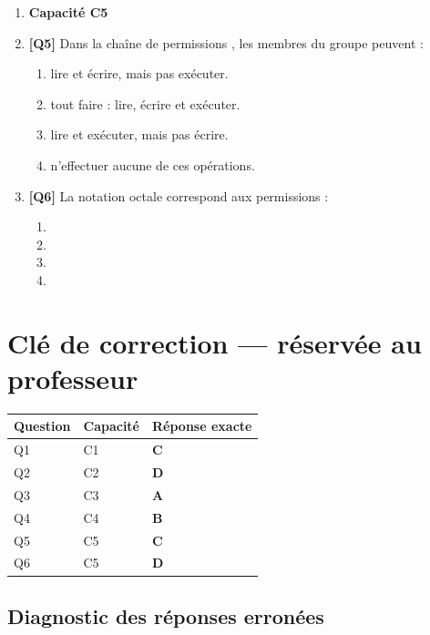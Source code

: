 \begin{enumerate}
\item[] \textbf{Capacité C5}

\item \textbf{[Q5]} Dans la chaîne de permissions , les membres du groupe peuvent :
  \begin{enumerate}[label=\Alph*.]
    \item lire et écrire, mais pas exécuter.
    \item tout faire : lire, écrire et exécuter.
    \item lire et exécuter, mais pas écrire.
    \item n'effectuer aucune de ces opérations.
  \end{enumerate}

\item \textbf{[Q6]} La notation octale  correspond aux permissions :
  \begin{enumerate}[label=\Alph*.]
    \item {}
    \item {}
    \item {}
    \item {}
  \end{enumerate}

\end{enumerate}

\ifnxVersionProfesseur
\clearpage
\section*{Clé de correction — réservée au professeur}

\begin{center}
\begin{tabular}{lll}
\hline
Question & Capacité & Réponse exacte \\
\hline
Q1 & C1 & \textbf{C} \\
Q2 & C2 & \textbf{D} \\
Q3 & C3 & \textbf{A} \\
Q4 & C4 & \textbf{B} \\
Q5 & C5 & \textbf{C} \\
Q6 & C5 & \textbf{D} \\
\hline
\end{tabular}
\end{center}

\subsection*{Diagnostic des réponses erronées}

